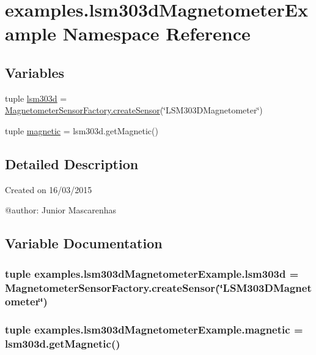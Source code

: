 \hypertarget{namespaceexamples_1_1lsm303dMagnetometerExample}{}\section{examples.\+lsm303d\+Magnetometer\+Example Namespace Reference}
\label{namespaceexamples_1_1lsm303dMagnetometerExample}
\subsection*{Variables}
\begin{DoxyCompactItemize}
\item 
tuple \hyperlink{namespaceexamples_1_1lsm303dMagnetometerExample_afe72d3215980bd73c190d8ecd30e7ab1}{lsm303d} = \hyperlink{classconcretefactory_1_1magnetometerSensorFactory_1_1MagnetometerSensorFactory_ab20fa7eddd0b13d22727989f72fa9cde}{Magnetometer\+Sensor\+Factory.\+create\+Sensor}(\char`\"{}L\+S\+M303\+D\+Magnetometer\char`\"{})
\item 
tuple \hyperlink{namespaceexamples_1_1lsm303dMagnetometerExample_aa8e2a55c37895144a145c9ca82878b3c}{magnetic} = lsm303d.\+get\+Magnetic()
\end{DoxyCompactItemize}


\subsection{Detailed Description}
\begin{DoxyVerb}Created on 16/03/2015

@author: Junior Mascarenhas
\end{DoxyVerb}
 

\subsection{Variable Documentation}
\hypertarget{namespaceexamples_1_1lsm303dMagnetometerExample_afe72d3215980bd73c190d8ecd30e7ab1}{}
\subsubsection[{lsm303d}]{\setlength{\rightskip}{0pt plus 5cm}tuple examples.\+lsm303d\+Magnetometer\+Example.\+lsm303d = {\bf Magnetometer\+Sensor\+Factory.\+create\+Sensor}(\char`\"{}L\+S\+M303\+D\+Magnetometer\char`\"{})}\label{namespaceexamples_1_1lsm303dMagnetometerExample_afe72d3215980bd73c190d8ecd30e7ab1}
\hypertarget{namespaceexamples_1_1lsm303dMagnetometerExample_aa8e2a55c37895144a145c9ca82878b3c}{}
\subsubsection[{magnetic}]{\setlength{\rightskip}{0pt plus 5cm}tuple examples.\+lsm303d\+Magnetometer\+Example.\+magnetic = lsm303d.\+get\+Magnetic()}\label{namespaceexamples_1_1lsm303dMagnetometerExample_aa8e2a55c37895144a145c9ca82878b3c}
